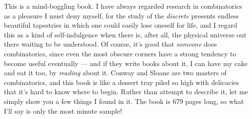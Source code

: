 \documentclass[12pt]{article}
\begin{document}
This is a mind-boggling book. I have always regarded research in
combinatorics as a pleasure I must deny myself, for the study of the
\emph{discrete} presents endless beautiful tapestries in which one could
easily lose oneself for life, and I regard this as a kind of
self-indulgence when there is, after all, the physical universe out
there waiting to be understood. Of course, it's good that \emph{someone}
does combinatorics, since even the most obscure corners have a strong
tendency to become useful eventually --- and if they write books about
it, I can have my cake and eat it too, by \emph{reading} about it.
Conway and Sloane are two masters of combinatorics, and this book is
like a dessert tray piled so high with delicacies that it's hard to know
where to begin. Rather than attempt to describe it, let me simply show
you a few things I found in it. The book is 679 pages long, so what I'll
say is only the most minute sample!
\end{document}

